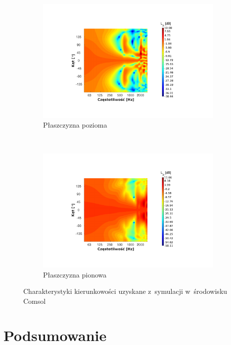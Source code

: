 \documentclass[12pt]{oska}
\begin{document}
	\begin{figure}[!ht]
		\centering
		\begin{subfigure}[b]{.49\textwidth}
			\includegraphics[width=\textwidth,trim={4.6cm 2.6cm 5.8cm 2.7cm},clip]{Comsol_kier_osie_hor.pdf}
			\caption{Płaszczyzna pozioma}
			\label{r:C_poziom}
		\end{subfigure}
		~
		\begin{subfigure}[b]{.49\textwidth}
			\includegraphics[width=\textwidth,trim={4.6cm 2.6cm 5.8cm 2.7cm},clip]{Comsol_kier_osie_ver.pdf}
			\caption{Płaszczyzna pionowa}
			\label{r:C_pion}
		\end{subfigure}
		
		\caption{Charakterystyki kierunkowości uzyskane z~symulacji w~środowisku Comsol}
		\label{r:C_kierunk}
	\end{figure}
	
	\newpage
	\section{Podsumowanie}
	
\end{document}
